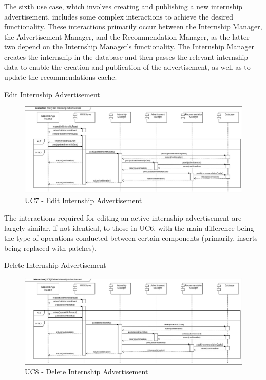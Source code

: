 \begin{enumerate}[label={[UC\arabic*]}]
    The sixth use case, which involves creating and publishing a new internship advertisement, includes some complex interactions to achieve the desired functionality. These interactions primarily occur between the Internship Manager, the Advertisement Manager, and the Recommendation Manager, as the latter two depend on the Internship Manager's functionality. The Internship Manager creates the internship in the database and then passes the relevant internship data to enable the creation and publication of the advertisement, as well as to update the recommendations cache.
    
    \item Edit Internship Advertisement
    \begin{figure}[h]
        \centering
        \includegraphics[width=1\linewidth]{DD-Latex//assets//Runtime View Diagrams/UC7.jpg}
        \caption{UC7 - Edit Internship Advertisement}
        \label{fig:UC7}
    \end{figure}

    The interactions required for editing an active internship advertisement are largely similar, if not identical, to those in UC6, with the main difference being the type of operations conducted between certain components (primarily, inserts being replaced with patches).
    
    \item Delete Internship Advertisement
     \begin{figure}[h]
        \centering
        \includegraphics[width=1\linewidth]{DD-Latex//assets//Runtime View Diagrams/UC8.jpg}
        \caption{UC8 - Delete Internship Advertisement}
        \label{fig:UC8}
    \end{figure}


\end{enumerate}
